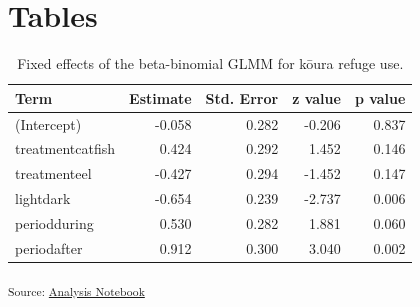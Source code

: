 \documentclass[
  letterpaper,
  DIV=11,
  numbers=noendperiod]{scrartcl}
\begin{document}
\section*{Tables}\label{tables}

{

\begin{longtable}[]{@{}lrrrr@{}}

\caption{\label{tbl-1-fixed-effects}Fixed effects of the beta-binomial
GLMM for kōura refuge use.}

\tabularnewline

\toprule\noalign{}
Term & Estimate & Std. Error & z value & p value \\
\midrule\noalign{}
\endhead
\bottomrule\noalign{}
\endlastfoot
(Intercept) & -0.058 & 0.282 & -0.206 & 0.837 \\
treatmentcatfish & 0.424 & 0.292 & 1.452 & 0.146 \\
treatmenteel & -0.427 & 0.294 & -1.452 & 0.147 \\
lightdark & -0.654 & 0.239 & -2.737 & 0.006 \\
periodduring & 0.530 & 0.282 & 1.881 & 0.060 \\
periodafter & 0.912 & 0.300 & 3.040 & 0.002 \\

\end{longtable}

}

\textsubscript{Source:
\href{https://OlivierRaven.github.io/https---github.com-OlivierRaven-NCE_Koura_catfish/analysis-preview.html\#cell-tbl-1-fixed-effects}{Analysis
Notebook}}
\end{document}
